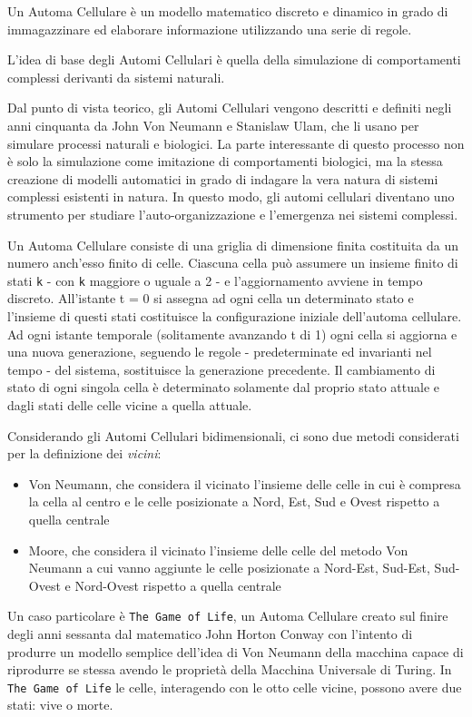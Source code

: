 Un Automa Cellulare è un modello matematico discreto e dinamico in grado di immagazzinare ed elaborare informazione utilizzando una serie di regole.
\par
L’idea di base degli Automi Cellulari è quella della simulazione di comportamenti complessi derivanti da sistemi naturali.
\par
Dal punto di vista teorico, gli Automi Cellulari vengono descritti e definiti negli anni cinquanta da John Von Neumann e Stanislaw Ulam, che li usano per simulare processi naturali e biologici. La parte interessante di questo processo non è solo la simulazione come imitazione di comportamenti biologici, ma la stessa creazione di modelli automatici in grado di indagare la vera natura di sistemi complessi esistenti in natura. In questo modo, gli automi cellulari diventano uno strumento per studiare l’auto-organizzazione e l’emergenza nei sistemi complessi.
\par
Un Automa Cellulare consiste di una griglia di dimensione finita costituita da un numero anch’esso finito di celle. Ciascuna cella può assumere un insieme finito di stati \texttt{k} - con \texttt{k} maggiore o uguale a 2 - e l'aggiornamento avviene in tempo discreto. All’istante t = 0 si assegna ad ogni cella un determinato stato e l’insieme di questi stati costituisce la configurazione iniziale dell'automa cellulare. Ad ogni istante temporale (solitamente avanzando t di 1) ogni cella si aggiorna e una nuova generazione, seguendo le regole - predeterminate ed invarianti nel tempo - del sistema, sostituisce la generazione precedente. Il cambiamento di stato di ogni singola cella è determinato solamente dal proprio stato attuale e dagli stati delle celle vicine a quella attuale. 
\par
Considerando gli Automi Cellulari bidimensionali, ci sono due metodi considerati per la definizione dei \textit{vicini}:
\begin{itemize}
\item Von Neumann, che considera il vicinato l'insieme delle celle in cui è compresa la cella al centro e le celle posizionate a Nord, Est, Sud e Ovest rispetto a quella centrale
\item Moore, che considera il vicinato l'insieme delle celle del metodo Von Neumann a cui vanno aggiunte le celle posizionate a Nord-Est, Sud-Est, Sud-Ovest e Nord-Ovest rispetto a quella centrale
\end{itemize}
\par
Un caso particolare è \texttt{The Game of Life}, un Automa Cellulare creato sul finire degli anni sessanta dal matematico John Horton Conway con l’intento di produrre un modello semplice dell’idea di Von Neumann della macchina capace di riprodurre se stessa avendo le proprietà della Macchina Universale di Turing. In \texttt{The Game of Life} le celle, interagendo con le otto celle vicine, possono avere due stati: vive o morte.
